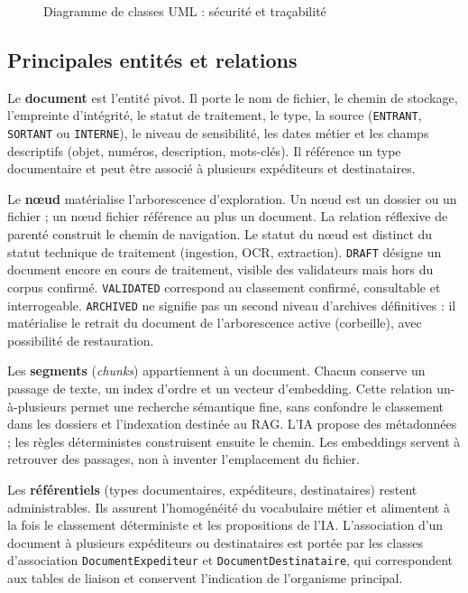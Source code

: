 \begin{figure}[H]
\centering

\caption{Diagramme de classes UML : sécurité et traçabilité}
\label{fig:modele-donnees-securite}
\end{figure}

\subsection{Principales entités et relations}

Le \textbf{document} est l'entité pivot. Il porte le nom de fichier, le chemin de stockage, l'empreinte d'intégrité, le statut de traitement, le type, la source (\texttt{ENTRANT}, \texttt{SORTANT} ou \texttt{INTERNE}), le niveau de sensibilité, les dates métier et les champs descriptifs (objet, numéros, description, mots-clés). Il référence un type documentaire et peut être associé à plusieurs expéditeurs et destinataires.

Le \textbf{nœud} matérialise l'arborescence d'exploration. Un nœud est un dossier ou un fichier ; un nœud fichier référence au plus un document. La relation réflexive de parenté construit le chemin de navigation. Le statut du nœud est distinct du statut technique de traitement (ingestion, OCR, extraction). \texttt{DRAFT} désigne un document encore en cours de traitement, visible des validateurs mais hors du corpus confirmé. \texttt{VALIDATED} correspond au classement confirmé, consultable et interrogeable. \texttt{ARCHIVED} ne signifie pas un second niveau d'archives définitives : il matérialise le retrait du document de l'arborescence active (corbeille), avec possibilité de restauration.

Les \textbf{segments} (\textit{chunks}) appartiennent à un document. Chacun conserve un passage de texte, un index d'ordre et un vecteur d'embedding. Cette relation un-à-plusieurs permet une recherche sémantique fine, sans confondre le classement dans les dossiers et l'indexation destinée au RAG. L'IA propose des métadonnées ; les règles déterministes construisent ensuite le chemin. Les embeddings servent à retrouver des passages, non à inventer l'emplacement du fichier.

Les \textbf{référentiels} (types documentaires, expéditeurs, destinataires) restent administrables. Ils assurent l'homogénéité du vocabulaire métier et alimentent à la fois le classement déterministe et les propositions de l'IA. L'association d'un document à plusieurs expéditeurs ou destinataires est portée par les classes d'association \texttt{DocumentExpediteur} et \texttt{DocumentDestinataire}, qui correspondent aux tables de liaison et conservent l'indication de l'organisme principal.

